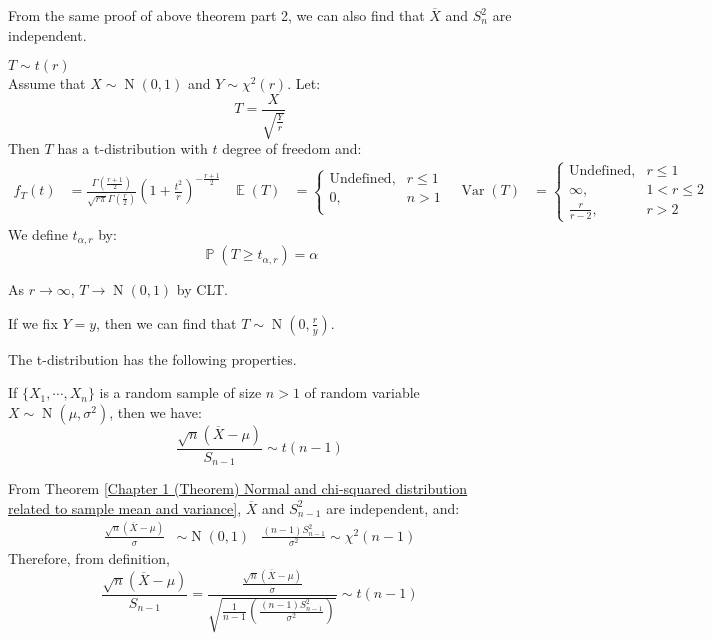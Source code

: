\documentclass{huhtakm-template-book-v2}
\DeclareMathOperator{\prob}{\mathbb{P}}
\DeclareMathOperator{\E}{\mathbb{E}}
\DeclareMathOperator{\Var}{Var}
\DeclareMathOperator{\N}{N}
\begin{document}
\begin{rem}
	From the same proof of above theorem part 2, we can also find that $\overline{X}$ and $S_{n}^{2}$ are independent.
\end{rem}
\begin{eg} $T\sim t(r)$\\
	Assume that $X\sim\N(0,1)$ and $Y\sim\chi^{2}(r)$. Let:
	\begin{equation*}
		T=\frac{X}{\sqrt{\frac{Y}{r}}}
	\end{equation*}
	Then $T$ has a t-distribution with $t$ degree of freedom and:
	\begin{align*}
		f_{T}(t)&=\frac{\Gamma\left(\frac{r+1}{2}\right)}{\sqrt{r\pi}\Gamma\left(\frac{r}{2}\right)}\left(1+\frac{t^{2}}{r}\right)^{-\frac{r+1}{2}} & \E(T)&=\begin{cases}
			\text{Undefined}, &r\leq 1\\
			0, &n>1\\
		\end{cases} & \Var(T)&=\begin{cases}
			\text{Undefined}, &r\leq 1\\
			\infty, &1<r\leq 2\\
			\frac{r}{r-2}, &r>2
		\end{cases}
	\end{align*}
	We define $t_{\alpha,r}$ by:
	\begin{equation*}
		\prob(T\geq t_{\alpha,r})=\alpha
	\end{equation*}
\end{eg}
\begin{rem}
	As $r\to\infty$, $T\to\N(0,1)$ by CLT.
\end{rem}
\begin{rem}
	If we fix $Y=y$, then we can find that $T\sim\N(0,\frac{r}{y})$.
\end{rem}
The t-distribution has the following properties.
\begin{thm}
	If $\{X_{1},\cdots,X_{n}\}$ is a random sample of size $n>1$ of random variable $X\sim\N(\mu,\sigma^{2})$, then we have:
	\begin{equation*}
		\frac{\sqrt{n}(\overline{X}-\mu)}{S_{n-1}}\sim t(n-1)
	\end{equation*}
\end{thm}
\begin{proofing}
	From Theorem \ref{Chapter 1 (Theorem) Normal and chi-squared distribution related to sample mean and variance}, $\overline{X}$ and $S_{n-1}^{2}$ are independent, and:
	\begin{align*}
		\frac{\sqrt{n}(\overline{X}-\mu)}{\sigma}&\sim\N(0,1) & \frac{(n-1)S_{n-1}^{2}}{\sigma^{2}}\sim\chi^{2}(n-1)
	\end{align*}
	Therefore, from definition,
	\begin{equation*}
		\frac{\sqrt{n}(\overline{X}-\mu)}{S_{n-1}}=\frac{\frac{\sqrt{n}(\overline{X}-\mu)}{\sigma}}{\sqrt{\frac{1}{n-1}\left(\frac{(n-1)S_{n-1}^{2}}{\sigma^{2}}\right)}}\sim t(n-1)
	\end{equation*}
\end{proofing}
\end{document}

